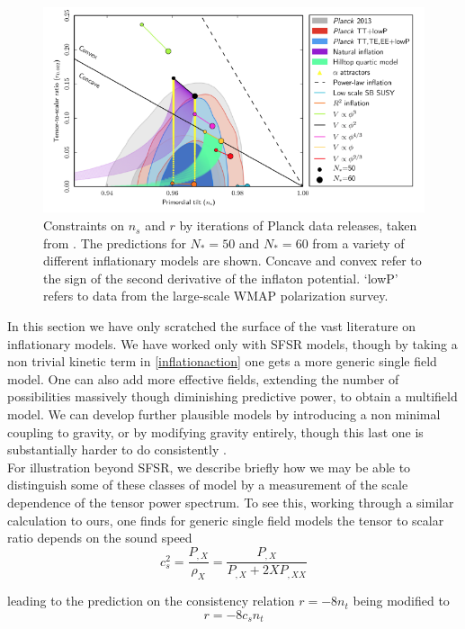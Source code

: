 \documentclass[a4paper,10pt]{article}
\begin{document}
\begin{figure}[h]
  \includegraphics[width=0.7\linewidth]{modeldepconstraints.png}
  \centering
  \caption{Constraints on $n_s$ and $r$ by iterations of Planck data releases, taken from \cite{QBM}. The predictions for $N_*=50$ and $N_*=60$ from a variety of different inflationary models are shown. Concave and convex refer to the sign of the second derivative of the inflaton potential. `lowP' refers to data from the large-scale WMAP polarization survey.}
\label{inflationconstraints}  
\end{figure}


In this section we have only scratched the surface of the vast literature on inflationary models. We have worked only with SFSR models, though by taking a non trivial kinetic term in \ref{inflationaction} one gets a more generic single field model. One can also add more effective fields, extending the number of possibilities massively though diminishing predictive power, to obtain a multifield model. We can develop further plausible models by introducing a non minimal coupling to gravity, or by modifying gravity entirely, though this last one is substantially harder to do consistently \cite{baumannTASILecturesInflation2012}.\\

For illustration beyond SFSR, we describe briefly how we may be able to distinguish some of these classes of model by a measurement of the scale dependence of the tensor power spectrum. To see this, working through a similar calculation to ours, one finds for generic single field models the tensor to scalar ratio depends on the sound speed \cite{CMBPol}
\begin{equation}
c_s^2 = \frac{P_{,X}}{\rho_X} = \frac{P_{,X}}{P_{,X}+2XP_{,XX}}
\end{equation}

leading to the prediction on the consistency relation $r=-8n_t$ being modified to 
\begin{equation}
r=-8c_sn_t
\end{equation}
\end{document}
